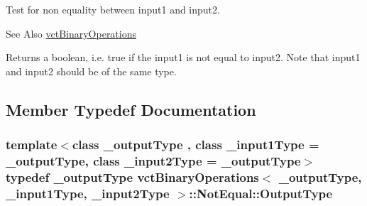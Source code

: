 Test for non equality between input1 and input2. 

\begin{DoxySeeAlso}{See Also}
\hyperlink{classvct_binary_operations}{vct\-Binary\-Operations}
\end{DoxySeeAlso}
Returns a boolean, i.\-e. true if the input1 is not equal to input2. Note that input1 and input2 should be of the same type. 

\subsection{Member Typedef Documentation}
\hypertarget{classvct_binary_operations_1_1_not_equal_a3abb820f974d81c4302dda44cbc5c98b}{
\subsubsection[{Output\-Type}]{\setlength{\rightskip}{0pt plus 5cm}template$<$class \-\_\-output\-Type , class \-\_\-input1\-Type  = \-\_\-output\-Type, class \-\_\-input2\-Type  = \-\_\-output\-Type$>$ typedef \-\_\-output\-Type {\bf vct\-Binary\-Operations}$<$ \-\_\-output\-Type, \-\_\-input1\-Type, \-\_\-input2\-Type $>$\-::{\bf Not\-Equal\-::\-Output\-Type}}}\label{classvct_binary_operations_1_1_not_equal_a3abb820f974d81c4302dda44cbc5c98b}


